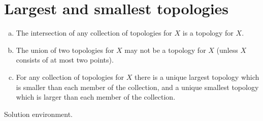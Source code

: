 \section{Largest and smallest topologies}
\label{exercises:01-A}

\begin{exercise}
  \begin{enumerate}[(a)]
    \item
      The intersection of any collection of topologies for \(X\) is a topology
      for \(X\).
    \item
      The union of two topologies for \(X\) may not be a topology for \(X\)
      (unless \(X\) consists of at most two points).
    \item
      For any collection of topologies for \(X\) there is a unique largest
      topology which is smaller than each member of the collection, and a unique
      smallest topology which is larger than each member of the collection.
  \end{enumerate}
\end{exercise}

\begin{solution}
  Solution environment.
\end{solution}
